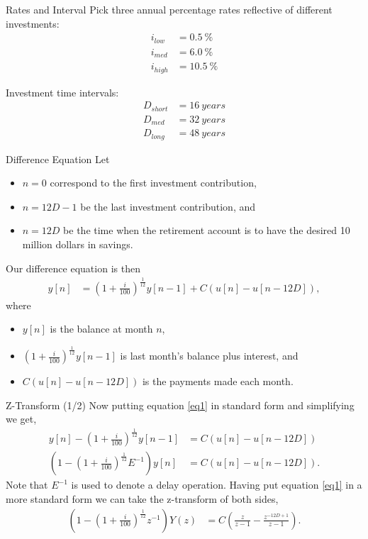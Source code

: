 \documentclass[
    orient=landscape,
    style=sailor
]{powerdot}
\begin{document}
\begin{slide}{Rates and Interval}
	Pick three annual percentage rates reflective of different investments:
	\begin{align*}
	i_{low}  &= \SI{0.5}{\%}  \\
	i_{med}  &= \SI{6.0}{\%}  \\
	i_{high} &= \SI{10.5}{\%}
	\end{align*}
	
	Investment time intervals:
	\begin{align*}
	D_{short} &= \SI{16}{years}  \\
	D_{med}   &= \SI{32}{years}  \\
	D_{long}  &= \SI{48}{years}
	\end{align*}
\end{slide}

\begin{slide}{Difference Equation}
	Let 
	\begin{itemize}
		\item $n=0$ correspond to the first investment contribution, 
		\item $n = 12D -1$ be the last investment contribution, and 
		\item $n = 12D$ be the time when the retirement account is to have the desired 10 million dollars in savings.
	\end{itemize}
	Our difference equation is then
	\begin{align}
	y[n] &= \left(1 + \frac{i}{100} \right)^{\frac{1}{12}} y[n-1] + C (u[n] - u[n-12D]), \label{eq1}
	\end{align}
	where 
	\begin{itemize}
		\item $y[n]$ is the balance at month $n$, 
		\item $\left(1 + \frac{i}{100} \right)^{\frac{1}{12}} y[n-1]$ is last month's balance plus interest, and 
		\item $C(u[n] - u[n-12D])$ is the payments made each month.
	\end{itemize}
\end{slide}

\begin{slide}{Z-Transform (1/2)}
	Now putting equation \ref{eq1} in standard form and simplifying we get,
	\begin{align}
	y[n] - \left(1 + \frac{i}{100} \right)^{\frac{1}{12}} y[n-1] &= C (u[n] - u[n-12D]) \\
	\left(1 - \left(1 + \frac{i}{100} \right)^{\frac{1}{12}}E^{-1}\right)y[n] &= C (u[n] - u[n-12D]). \label{eq2}
	\end{align}
	Note that $E^{-1}$ is used to denote a delay operation. Having put equation \ref{eq1} in a more standard form we can take the z-transform of both sides,
	\begin{align}
	\left(1 - \left(1 + \frac{i}{100} \right)^{\frac{1}{12}}z^{-1}\right)Y(z) &= C \left(\frac{z}{z-1} - \frac{z^{-12D+1}}{z-1} \right).
	\end{align}
\end{slide}
\end{document}

